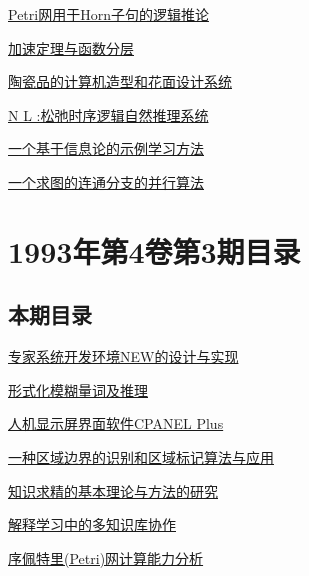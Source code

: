 \documentclass[a4paper]{article}
\begin{document}
\href{http://www.jos.org.cn/ch/reader/download_pdf.aspx?file_no=19930406&year_id=1993&quarter_id=4&falg=1}{Petri网用于Horn子句的逻辑推论}

\href{http://www.jos.org.cn/ch/reader/download_pdf.aspx?file_no=19930407&year_id=1993&quarter_id=4&falg=1}{加速定理与函数分层}

\href{http://www.jos.org.cn/ch/reader/download_pdf.aspx?file_no=19930408&year_id=1993&quarter_id=4&falg=1}{陶瓷品的计算机造型和花面设计系统}

\href{http://www.jos.org.cn/ch/reader/download_pdf.aspx?file_no=19930409&year_id=1993&quarter_id=4&falg=1}{N L :松弛时序逻辑自然推理系统}

\href{http://www.jos.org.cn/ch/reader/download_pdf.aspx?file_no=19930410&year_id=1993&quarter_id=4&falg=1}{一个基于信息论的示例学习方法}

\href{http://www.jos.org.cn/ch/reader/download_pdf.aspx?file_no=19930411&year_id=1993&quarter_id=4&falg=1}{一个求图的连通分支的并行算法}


\section{\textbf{1993年第4卷第3期目录}}
\subsection{本期目录}
\href{http://www.jos.org.cn/ch/reader/download_pdf.aspx?file_no=19930301&year_id=1993&quarter_id=3&falg=1}{专家系统开发环境NEW的设计与实现}

\href{http://www.jos.org.cn/ch/reader/download_pdf.aspx?file_no=19930302&year_id=1993&quarter_id=3&falg=1}{形式化模糊量词及推理}

\href{http://www.jos.org.cn/ch/reader/download_pdf.aspx?file_no=19930303&year_id=1993&quarter_id=3&falg=1}{人机显示屏界面软件CPANEL Plus}

\href{http://www.jos.org.cn/ch/reader/download_pdf.aspx?file_no=19930304&year_id=1993&quarter_id=3&falg=1}{一种区域边界的识别和区域标记算法与应用}

\href{http://www.jos.org.cn/ch/reader/download_pdf.aspx?file_no=19930305&year_id=1993&quarter_id=3&falg=1}{知识求精的基本理论与方法的研究}

\href{http://www.jos.org.cn/ch/reader/download_pdf.aspx?file_no=19930306&year_id=1993&quarter_id=3&falg=1}{解释学习中的多知识库协作}

\href{http://www.jos.org.cn/ch/reader/download_pdf.aspx?file_no=19930307&year_id=1993&quarter_id=3&falg=1}{序佩特里(Petri)网计算能力分析}
\end{document}
